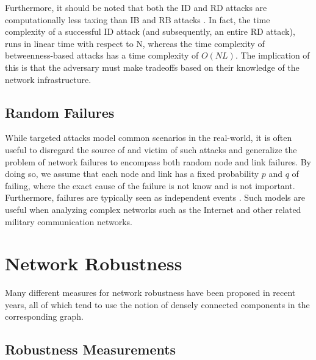 \documentclass[11pt]{article}
\begin{document}
Furthermore, it should be noted that both the ID and RD attacks are computationally less taxing than IB and RB attacks \cite{Attacks}. In fact, the time complexity of a successful ID attack (and subsequently, an entire RD attack), runs in linear time with respect to N, whereas the time complexity of betweenness-based attacks has a time complexity of $O(NL)$. The implication of this is that the adversary must make tradeoffs based on their knowledge of the network infrastructure.

\subsection{Random Failures}
\label{RandomFailures}
While targeted attacks model common scenarios in the real-world, it is often useful to disregard the source of and victim of such attacks and generalize the problem of network failures to encompass both random node and link failures. By doing so, we assume that each node and link has a fixed probability $p$ and $q$ of failing, where the exact cause of the failure is not know and is not important. Furthermore, failures are typically seen as independent events \cite{RandomStudy}. Such models are useful when analyzing complex networks such as the Internet and other related military communication networks. 

\section{Network Robustness}

Many different measures for network robustness have been proposed in recent years, all of which tend
to use the notion of densely connected components in the corresponding graph. 


\subsection{Robustness Measurements}
\end{document}
